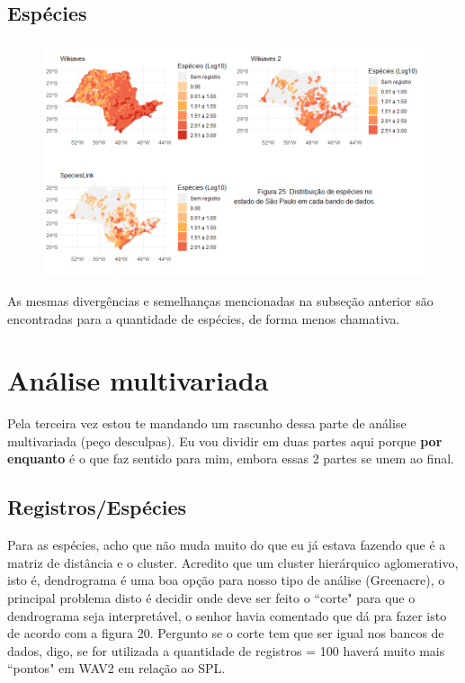 \documentclass[12pt]{extarticle}
\newcommand{\asp}[1]{``#1"}
\newenvironment{resposta}{ \color{mygray}}{}
\begin{document}
\subsection {Espécies}

\begin{figure}[h!]
\centering
\includegraphics[width=17cm]{Imagens/M05.png}
\end{figure}

\begin{resposta}
As mesmas divergências e semelhanças mencionadas na subseção anterior são encontradas para a quantidade de espécies, de forma menos chamativa. 
\end{resposta}


\section{Análise multivariada}

Pela terceira vez estou te mandando um rascunho dessa parte de análise multivariada (peço desculpas). Eu vou dividir em duas partes aqui porque \textbf{por enquanto} é o que faz sentido para mim, embora essas 2 partes se unem ao final.



\subsection{Registros/Espécies}

Para as espécies, acho que não muda muito do que eu já estava fazendo que é a matriz de distância e o cluster. Acredito que um cluster hierárquico aglomerativo, isto é, dendrograma é uma boa opção para nosso tipo de análise (Greenacre), o principal problema disto é decidir onde deve ser feito o \asp{corte} para que o dendrograma seja interpretável, o senhor havia comentado que dá pra fazer isto de acordo com a figura 20. Pergunto se o corte tem que ser igual nos bancos de dados, digo, se for utilizada a quantidade de registros = 100 haverá muito mais \asp{pontos} em WAV2 em relação ao SPL. 
\end{document}
